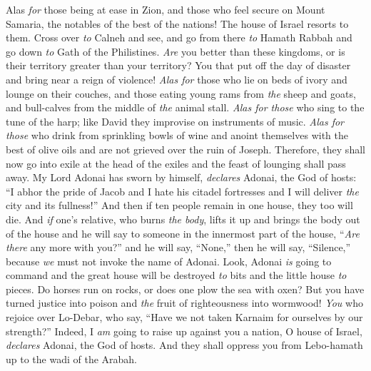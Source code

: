 \begin{biblechapter} %
 Alas \textit{for} those being at ease in Zion, and those who feel secure on Mount Samaria, the notables of the best of the nations! The house of Israel resorts to them.
\verse Cross over \textit{to} Calneh and see, and go from there \textit{to} Hamath Rabbah and go down \textit{to} Gath of the Philistines. \textit{Are} you better than these kingdoms, or is their territory greater than your territory?
\verse You that put off the day of disaster and bring near a reign of violence!
\verse \textit{Alas for} those who lie on beds of ivory and lounge on their couches, and those eating young rams from \textit{the} sheep and goats, and bull-calves from the middle of \textit{the} animal stall.
\verse \textit{Alas for those} who sing to the tune of the harp; like David they improvise on instruments of music.
\verse \textit{Alas for those} who drink from sprinkling bowls of wine and anoint themselves with the best of olive oils and are not grieved over the ruin of Joseph.
\verse Therefore, they shall now go into exile at the head of the exiles and the feast of lounging shall pass away.
 My Lord Adonai has sworn by himself, \textit{declares} Adonai, the God of hosts: “I abhor the pride of Jacob and I hate his citadel fortresses and I will deliver \textit{the} city and its fullness!”
\verse And then if ten people remain in one house, they too will die.
\verse And \textit{if} one’s relative, who burns \textit{the body}, lifts it up and brings the body out of the house and he will say to someone in the innermost part of the house, “\textit{Are there} any more with you?” and he will say, “None,” then he will say, “Silence,” because \textit{we} must not invoke the name of Adonai.
\verse Look, Adonai \textit{is} going to command and the great house will be destroyed \textit{to} bits and the little house \textit{to} pieces.
\verse Do horses run on rocks, or does one plow the sea with oxen? But you have turned justice into poison and \textit{the} fruit of righteousness into wormwood!
\verse \textit{You} who rejoice over Lo-Debar, who say, “Have we not taken Karnaim for ourselves by our strength?”
\verse Indeed, I \textit{am} going to raise up against you a nation, O house of Israel, \textit{declares} Adonai, the God of hosts. And they shall oppress you from Lebo-hamath up to the wadi of the Arabah.
\end{biblechapter}

